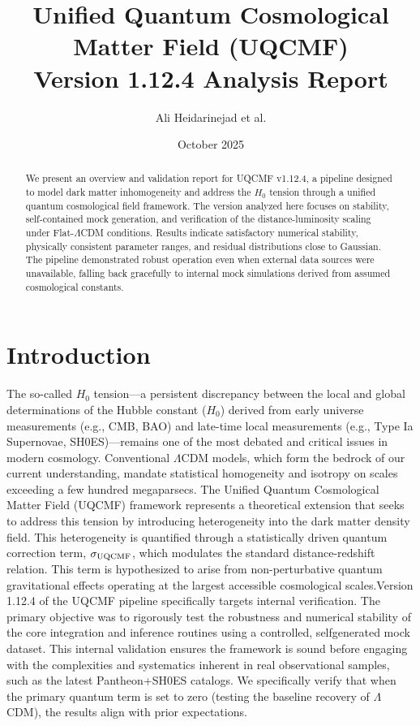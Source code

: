 \documentclass[11pt]{article}
\title{Unified Quantum Cosmological Matter Field (UQCMF)\\Version 1.12.4 Analysis Report}
\author{Ali Heidarinejad et al.}
\date{October 2025}
\begin{document}
\maketitle
\begin{abstract}
We present an overview and validation report for UQCMF v1.12.4, a pipeline
designed to model dark matter inhomogeneity and address the $H_0$ tension
through a unified quantum cosmological field framework. The version analyzed
here focuses on stability, self-contained mock generation, and verification of the
distance-luminosity scaling under Flat-$\Lambda$CDM conditions. Results
indicate satisfactory numerical stability, physically consistent parameter ranges,
and residual distributions close to Gaussian. The pipeline demonstrated robust
operation even when external data sources were unavailable, falling back
gracefully to internal mock simulations derived from assumed cosmological
constants.
\end{abstract}

\section{Introduction}
The so-called $H_0$ tension—a persistent discrepancy between the local and
global determinations of the Hubble constant ($H_0$) derived from early
universe measurements (e.g., CMB, BAO) and late-time local measurements
(e.g., Type Ia Supernovae, SH0ES)—remains one of the most debated and critical
issues in modern cosmology. Conventional $\Lambda$CDM models, which form
the bedrock of our current understanding, mandate statistical homogeneity and
isotropy on scales exceeding a few hundred megaparsecs.
The Unified Quantum Cosmological Matter Field (UQCMF) framework represents
a theoretical extension that seeks to address this tension by introducing
heterogeneity into the dark matter density field. This heterogeneity is quantified through a statistically driven quantum correction term, $\sigma_{\rm UQCMF}$,
which modulates the standard distance-redshift relation. This term is
hypothesized to arise from non-perturbative quantum gravitational effects
operating at the largest accessible cosmological scales.Version 1.12.4 of the UQCMF pipeline specifically targets internal verification.
The primary objective was to rigorously test the robustness and numerical
stability of the core integration and inference routines using a controlled, selfgenerated
mock dataset. This internal validation ensures the framework is sound
before engaging with the complexities and systematics inherent in real
observational samples, such as the latest Pantheon+SH0ES catalogs. We
specifically verify that when the primary quantum term is set to zero (testing the
baseline recovery of $\Lambda$CDM), the results align with prior expectations.
\end{document}
